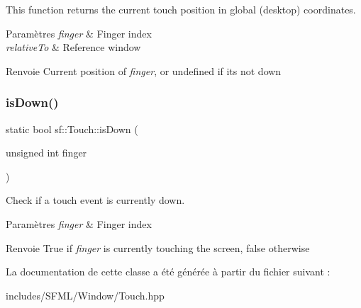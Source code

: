 This function returns the current touch position in global (desktop) coordinates.


\begin{DoxyParams}{Paramètres}
{\em finger} & Finger index \\
\hline
{\em relative\+To} & Reference window\\
\hline
\end{DoxyParams}
\begin{DoxyReturn}{Renvoie}
Current position of {\itshape finger}, or undefined if it\textquotesingle{}s not down 
\end{DoxyReturn}
\mbox{\label{classsf_1_1Touch_a2f85297123ea4e401d02c346e50d48a3}} 
\subsubsection{\texorpdfstring{is\+Down()}{isDown()}}
{\footnotesize\ttfamily static bool sf\+::\+Touch\+::is\+Down (\begin{DoxyParamCaption}\item[{unsigned int}]{finger }\end{DoxyParamCaption})\hspace{0.3cm}{\ttfamily [static]}}



Check if a touch event is currently down. 


\begin{DoxyParams}{Paramètres}
{\em finger} & Finger index\\
\hline
\end{DoxyParams}
\begin{DoxyReturn}{Renvoie}
True if {\itshape finger} is currently touching the screen, false otherwise 
\end{DoxyReturn}


La documentation de cette classe a été générée à partir du fichier suivant \+:\begin{DoxyCompactItemize}
\item 
includes/\+S\+F\+M\+L/\+Window/Touch.\+hpp\end{DoxyCompactItemize}
